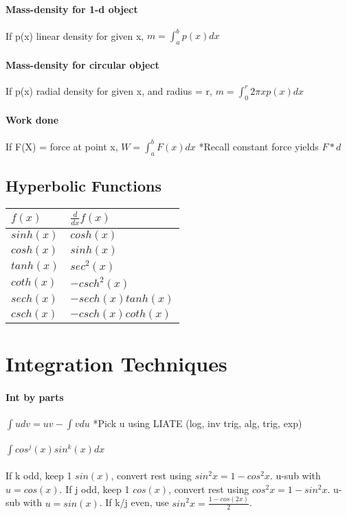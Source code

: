 \documentclass[10pt,landscape]{article}
\begin{document}
\begin{multicols}{4}
\paragraph{Mass-density for 1-d object}
If p(x) linear density for given x,
$m = \int_{a}^{b}p(x)dx$

\paragraph{Mass-density for circular object}
If p(x) radial density for given x, and radius = r,
$m = \int_{0}^{r}2 \pi x p(x)dx$

\paragraph{Work done}
If F(X) = force at point x,
$W = \int_{a}^{b} F(x) dx$
*Recall constant force yields $F*d$

\subsection{Hyperbolic Functions}

\begin{tabular}{l l}
$f(x)$ & $\frac{d}{dx}f(x)$ \\
\hline
$sinh(x)$ & $cosh(x)$ \\
$cosh(x)$ & $sinh(x)$ \\
$tanh(x)$ & $sec^2(x)$ \\
$coth(x)$ & $-csch^2(x)$ \\
$sech(x)$ & $-sech(x)tanh(x)$ \\
$csch(x)$ & $-csch(x)coth(x)$ \\
\hline
\end{tabular}

\section{Integration Techniques}

\paragraph{Int by parts} 
$\int u dv = uv - \int v du$
*Pick u using LIATE (log, inv trig, alg, trig, exp)

\paragraph{$ \int cos^j(x)sin^k(x)dx $}
If k odd, keep 1 $sin(x)$, convert rest using $sin^2x = 1-cos^2x$. u-sub with $u=cos(x)$.
If j odd, keep 1 $cos(x)$, convert rest using $cos^2x = 1-sin^2x$. u-sub with $u=sin(x)$.
If k/j even, use $sin^2x=\frac{1-cos(2x)}{2}$.


\end{multicols}
\end{document}
